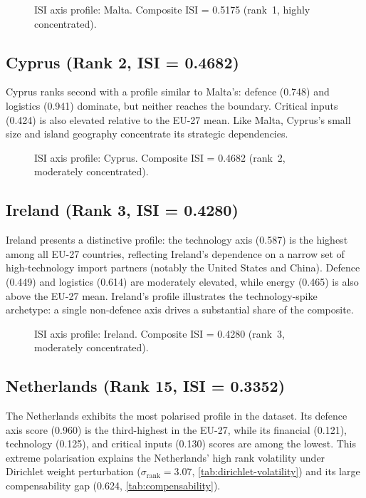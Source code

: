 \begin{figure}[htbp]
\centering

\caption{ISI axis profile: Malta.  Composite ISI = 0.5175 (rank~1,
  highly concentrated).}
\label{fig:radar-MT}
\end{figure}

\subsection{Cyprus (Rank 2, ISI = 0.4682)}

Cyprus ranks second with a profile similar to Malta's: defence
(0.748) and logistics (0.941) dominate, but neither reaches the
boundary.  Critical inputs (0.424) is also elevated relative to
the EU-27 mean.  Like Malta, Cyprus's small size and island geography
concentrate its strategic dependencies.

\begin{figure}[htbp]
\centering

\caption{ISI axis profile: Cyprus.  Composite ISI = 0.4682 (rank~2,
  moderately concentrated).}
\label{fig:radar-CY}
\end{figure}

\subsection{Ireland (Rank 3, ISI = 0.4280)}

Ireland presents a distinctive profile: the technology axis (0.587)
is the highest among all EU-27 countries, reflecting Ireland's
dependence on a narrow set of high-technology import partners
(notably the United States and China).  Defence (0.449) and
logistics (0.614) are moderately elevated, while energy (0.465) is
also above the EU-27 mean.  Ireland's profile illustrates the
technology-spike archetype: a single non-defence axis drives a
substantial share of the composite.

\begin{figure}[htbp]
\centering

\caption{ISI axis profile: Ireland.  Composite ISI = 0.4280 (rank~3,
  moderately concentrated).}
\label{fig:radar-IE}
\end{figure}

\subsection{Netherlands (Rank 15, ISI = 0.3352)}

The Netherlands exhibits the most polarised profile in the dataset.
Its defence axis score (0.960) is the third-highest in the EU-27,
while its financial (0.121), technology (0.125), and critical inputs
(0.130) scores are among the lowest.  This extreme polarisation
explains the Netherlands' high rank volatility under Dirichlet
weight perturbation ($\sigma_{\text{rank}} = 3.07$,
\cref{tab:dirichlet-volatility}) and its large compensability gap
(0.624, \cref{tab:compensability}).

